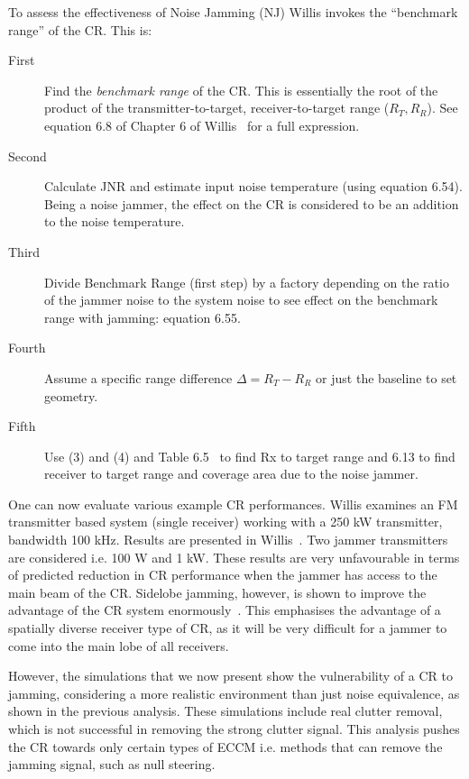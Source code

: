 \documentclass[english, 12pt]{report}
\begin{document}
To assess the effectiveness of Noise Jamming (NJ) Willis invokes the ``benchmark range'' of the CR. This is:

\begin{description}
\item[First ] 
Find the \emph{benchmark range} of the CR. This is essentially the root of the product of the transmitter-to-target, receiver-to-target range ($R_T , R_R$).
See  equation 6.8 of Chapter 6 of Willis~\cite{willis:07} for a full expression.


\item[Second] Calculate JNR and estimate input noise temperature (using equation 6.54). Being a noise jammer, the effect on the CR is considered to be an addition to the noise temperature.

\item[Third]
Divide Benchmark Range  (first step) by a factory depending on the ratio of the jammer noise to the system noise to see effect on the benchmark range with jamming: equation 6.55.

\item[Fourth]
Assume a specific range difference $\Delta = R_T - R_R$ or just the baseline to set geometry.

\item[Fifth]
Use (3) and (4) and Table 6.5~\cite[ p129]{willis:07} to find Rx to target range and 6.13 to find receiver to target range and coverage area due to the noise jammer.

\end{description}

One can now evaluate various example CR performances. Willis examines an FM transmitter based system (single receiver) working with a 250 kW transmitter, bandwidth 100 kHz. Results are presented in Willis~\cite[pages 175-178]{willis:07}. Two jammer transmitters are considered i.e. 100 W and 1 kW. These results are very unfavourable in terms of predicted reduction in CR performance when the jammer has access to the main beam of the CR. Sidelobe jamming, however, is shown to improve the advantage of the CR system enormously~\cite[Table 6-16)]{willis:07}. This emphasises the advantage of a spatially diverse receiver type of CR, as it will be very difficult for a jammer to come into the main lobe of all receivers.

However, the simulations that we now present show the vulnerability of a CR to jamming, considering a more realistic environment than just noise equivalence, as  shown in the previous analysis. These simulations include real clutter removal, which is not successful in removing the strong clutter signal. This analysis pushes the CR towards only certain types of ECCM i.e. methods that can remove the jamming signal, such as null steering.
\end{document}
